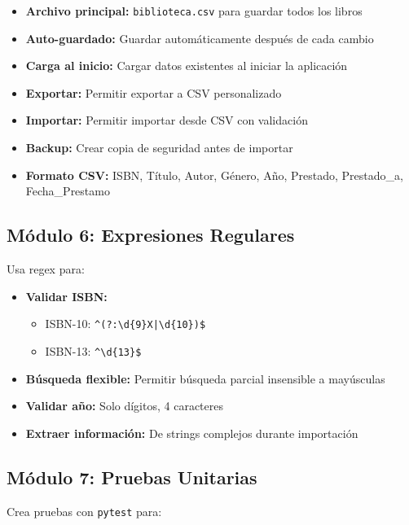 \documentclass[12pt,a4paper]{article}
\begin{document}
\begin{itemize}[leftmargin=*]
    \item \textbf{Archivo principal:} \texttt{biblioteca.csv} para guardar todos los libros
    \item \textbf{Auto-guardado:} Guardar automáticamente después de cada cambio
    \item \textbf{Carga al inicio:} Cargar datos existentes al iniciar la aplicación
    \item \textbf{Exportar:} Permitir exportar a CSV personalizado
    \item \textbf{Importar:} Permitir importar desde CSV con validación
    \item \textbf{Backup:} Crear copia de seguridad antes de importar
    \item \textbf{Formato CSV:} ISBN, Título, Autor, Género, Año, Prestado, Prestado\_a, Fecha\_Prestamo
\end{itemize}

\subsection{Módulo 6: Expresiones Regulares}

Usa regex para:

\begin{itemize}[leftmargin=*]
    \item \textbf{Validar ISBN:} 
    \begin{itemize}
        \item ISBN-10: \texttt{\^{}(?:\textbackslash d\{9\}X|\textbackslash d\{10\})\$}
        \item ISBN-13: \texttt{\^{}\textbackslash d\{13\}\$}
    \end{itemize}
    \item \textbf{Búsqueda flexible:} Permitir búsqueda parcial insensible a mayúsculas
    \item \textbf{Validar año:} Solo dígitos, 4 caracteres
    \item \textbf{Extraer información:} De strings complejos durante importación
\end{itemize}

\subsection{Módulo 7: Pruebas Unitarias}

Crea pruebas con \texttt{pytest} para:
\end{document}
